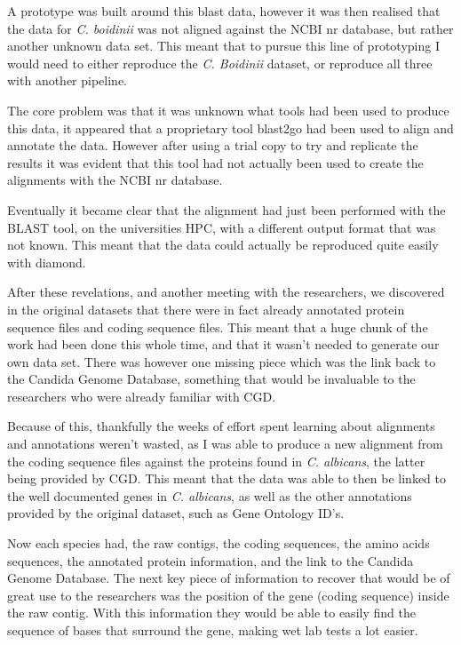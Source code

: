 A prototype was built around this blast data, however it was then realised that the data for \textit{C. boidinii} was not aligned against the NCBI nr database, but rather another unknown data set. This meant that to pursue this line of prototyping I would need to either reproduce the \textit{C. Boidinii} dataset, or reproduce all three with another pipeline. 

The core problem was that it was unknown what tools had been used to produce this data, it appeared that a proprietary tool blast2go\cite{blast2go} had been used to align and annotate the data. However after using a trial copy to try and replicate the results it was evident that this tool had not actually been used to create the alignments with the NCBI nr database. 

Eventually it became clear that the alignment had just been performed with the BLAST tool, on the universities HPC, with a different output format that was not known. This meant that the data could actually be reproduced quite easily with diamond. 

After these revelations, and another meeting with the researchers, we discovered in the original datasets that there were in fact already annotated protein sequence files and coding sequence files. This meant that a huge chunk of the work had been done this whole time, and that it wasn't needed to generate our own data set. There was however one missing piece which was the link back to the Candida Genome Database, something that would be invaluable to the researchers who were already familiar with CGD. 

Because of this, thankfully the weeks of effort spent learning about alignments and annotations weren't wasted, as I was able to produce a new alignment from the coding sequence files against the proteins found in \textit{C. albicans}, the latter being provided by CGD. This meant that the data was able to then be linked to the well documented genes in \textit{C. albicans}, as well as the other annotations provided by the original dataset, such as Gene Ontology ID's.

Now each species had, the raw contigs, the coding sequences, the amino acids sequences, the annotated protein information, and the link to the Candida Genome Database. The next key piece of information to recover that would be of great use to the researchers was the position of the gene (coding sequence) inside the raw contig. With this information they would be able to easily find the sequence of bases that surround the gene, making wet lab tests a lot easier. 

